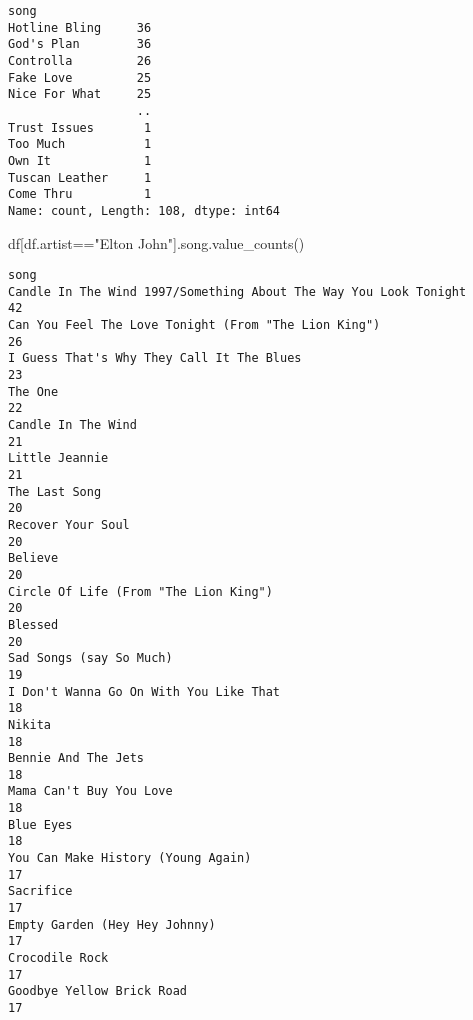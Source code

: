 \documentclass[
  a4paper,
]{scrbook}
\newenvironment{Shaded}{\begin{snugshade}}{\end{snugshade}}
\newcommand{\NormalTok}[1]{\textcolor[rgb]{0.00,0.23,0.31}{#1}}
\newcommand{\OperatorTok}[1]{\textcolor[rgb]{0.37,0.37,0.37}{#1}}
\newcommand{\StringTok}[1]{\textcolor[rgb]{0.13,0.47,0.30}{#1}}
\begin{document}
\begin{verbatim}
song
Hotline Bling     36
God's Plan        36
Controlla         26
Fake Love         25
Nice For What     25
                  ..
Trust Issues       1
Too Much           1
Own It             1
Tuscan Leather     1
Come Thru          1
Name: count, Length: 108, dtype: int64
\end{verbatim}

\begin{Shaded}
\begin{Highlighting}[]
\NormalTok{df[df.artist}\OperatorTok{==}\StringTok{"Elton John"}\NormalTok{].song.value\_counts()}
\end{Highlighting}
\end{Shaded}

\begin{verbatim}
song
Candle In The Wind 1997/Something About The Way You Look Tonight               42
Can You Feel The Love Tonight (From "The Lion King")                           26
I Guess That's Why They Call It The Blues                                      23
The One                                                                        22
Candle In The Wind                                                             21
Little Jeannie                                                                 21
The Last Song                                                                  20
Recover Your Soul                                                              20
Believe                                                                        20
Circle Of Life (From "The Lion King")                                          20
Blessed                                                                        20
Sad Songs (say So Much)                                                        19
I Don't Wanna Go On With You Like That                                         18
Nikita                                                                         18
Bennie And The Jets                                                            18
Mama Can't Buy You Love                                                        18
Blue Eyes                                                                      18
You Can Make History (Young Again)                                             17
Sacrifice                                                                      17
Empty Garden (Hey Hey Johnny)                                                  17
Crocodile Rock                                                                 17
Goodbye Yellow Brick Road                                                      17

\end{verbatim}
\end{document}
